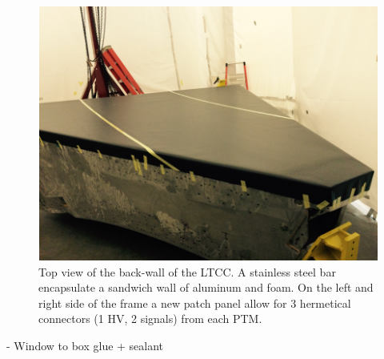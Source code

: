 \begin{figure}
	\centering
	\includegraphics[width=1.0\columnwidth,keepaspectratio]{img/upstreamWindow.png}
	\caption{Top view of the back-wall of the LTCC. A stainless steel bar encapsulate a sandwich wall of aluminum and foam. On the left and right side
				 of the frame a new patch panel allow for 3 hermetical connectors (1 HV, 2 signals) from each PTM. }
	\label{fig:upstreamWindow}
\end{figure}




- Window to box glue + sealant

